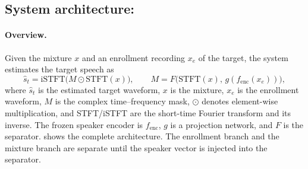 \documentclass[11pt,a4paper]{article}
\begin{document}
\subsection{System architecture:}
\label{sec:system}
\paragraph{Overview.}
Given the mixture $x$ and an enrollment recording $x_e$ of the target, the system estimates the
target speech as
\begin{equation}
  \hat{s}_t=\mathrm{iSTFT}\Big(M\odot \mathrm{STFT}(x)\Big),
  \qquad
  M=F\big(\mathrm{STFT}(x),\,g(f_{\mathrm{enc}}(x_e))\big),
\end{equation}
where $\hat{s}_t$ is the estimated target waveform, $x$ is the mixture, $x_e$ is the enrollment
waveform, $M$ is the complex time--frequency mask, $\odot$ denotes element-wise multiplication,
and STFT/iSTFT are the short-time Fourier transform and its inverse. The frozen speaker encoder
is $f_{\mathrm{enc}}$, $g$ is a projection network, and $F$ is the separator. 
shows the complete architecture. The enrollment branch and the mixture branch are separate until
the speaker vector is injected into the separator.
\end{document}
